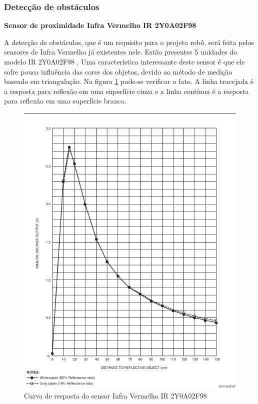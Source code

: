 \subsubsection{Detecção de obstáculos}

\textbf{Sensor de proximidade Infra Vermelho IR 2Y0A02F98}

A detecção de obstáculos, que é um requisito para o projeto robô, será feita pelos sensores de Infra Vermelho já existentes nele. Estão presentes 5 unidades do modelo IR 2Y0A02F98 \cite{ir_sensor}. Uma característica interessante deste sensor é que ele sofre pouca influência das cores dos objetos, devido ao método de medição baseado em triangulação. Na figura \ref{fig:ir_sensor_response} pode-se verificar o fato. A linha tracejada é a resposta para reflexão em uma superfície cinza e a linha contínua é a resposta para reflexão em uma superfície branca.

\begin{figure}[H]
\centering
\includegraphics[width=1\textwidth]{./figuras/quali/ir-sensor-response.png}
\caption{Curva de resposta do sensor Infra Vermelho IR 2Y0A02F98}
\label{fig:ir_sensor_response}
\end{figure}

